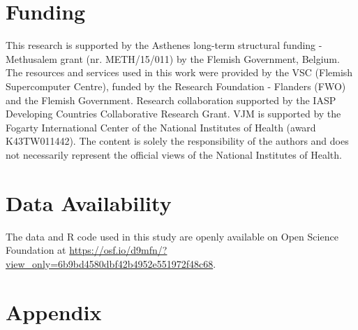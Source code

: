 \documentclass{article}
\begin{document}
\section{Funding} 

This research is supported by the Asthenes long-term structural funding - Methusalem grant (nr. METH/15/011) by the Flemish Government, Belgium. The resources and services used in this work were provided by the VSC (Flemish Supercomputer Centre), funded by the Research Foundation - Flanders (FWO) and the Flemish Government. Research collaboration supported by the IASP Developing Countries Collaborative Research Grant. VJM is supported by the Fogarty International Center of the National Institutes of Health (award K43TW011442). The content is solely the responsibility of the authors and does not necessarily represent the official views of the National Institutes of Health.

\section{Data Availability} 

The data and R code used in this study are openly available on Open Science Foundation at \href{https://osf.io/d9mfn/?view\_only=6b9bd4580dbf42b4952e551972f48c68}{https://osf.io/d9mfn/?view\_only=6b9bd4580dbf42b4952e551972f48c68}.

\section{Appendix} 
\end{document}
